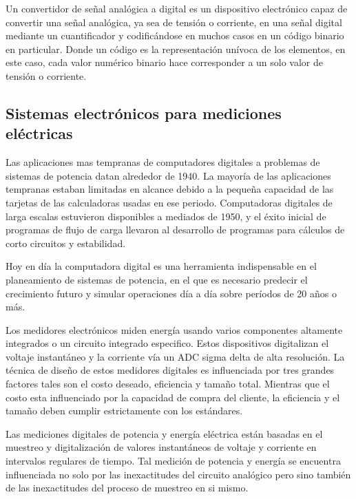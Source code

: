 Un convertidor de señal analógica a digital es un dispositivo electrónico capaz de convertir una señal analógica, ya sea de tensión o corriente, en una señal digital mediante un cuantificador y codificándose en muchos casos en un código binario en particular. Donde un código es la representación unívoca de los elementos, en este caso, cada valor numérico binario hace corresponder a un solo valor de tensión o corriente.



\subsection{Sistemas electrónicos para mediciones eléctricas}

Las aplicaciones mas tempranas de computadores digitales a problemas de sistemas de potencia datan alrededor de 1940. La mayoría de las aplicaciones tempranas estaban limitadas en alcance debido a la pequeña capacidad de las tarjetas de las calculadoras usadas en ese periodo. Computadoras digitales de larga escalas estuvieron disponibles a mediados de 1950, y el éxito inicial de programas de flujo de carga llevaron al desarrollo de programas para cálculos de corto circuitos y estabilidad.\citep{761852}

Hoy en día la computadora digital es una herramienta indispensable en el planeamiento de sistemas de potencia, en el que es necesario predecir el crecimiento futuro y simular operaciones día  a día sobre períodos de 20 años o más.\citep{761852}

Los medidores electrónicos miden energía usando varios componentes altamente integrados o un circuito integrado especifico. Estos dispositivos digitalizan el voltaje instantáneo y la corriente vía un ADC sigma delta  de alta resolución. La técnica de diseño de estos medidores digitales es influenciada por tres grandes factores tales son el costo deseado, eficiencia y tamaño total. Mientras que el costo esta influenciado por la capacidad de compra del cliente, la eficiencia y el tamaño deben cumplir estrictamente con los estándares.\citep{articleDM}

Las mediciones digitales de potencia y energía eléctrica están basadas en el muestreo y digitalización de valores instantáneos de voltaje y corriente en intervalos regulares de tiempo. Tal medición de potencia y energía se encuentra influenciada no solo por las inexactitudes del circuito analógico pero sino también de las inexactitudes del proceso de muestreo en si mismo.

